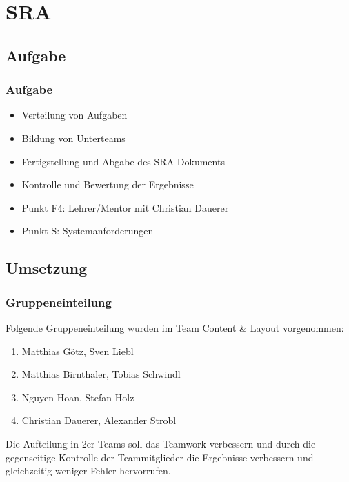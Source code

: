 \section{SRA}
\subsection{Aufgabe}
\begin{frame} %
  \frametitle{Aufgabe} %

  	\begin{itemize}
   		\item Verteilung von Aufgaben
   		\item Bildung von Unterteams
   		\item Fertigstellung und Abgabe des SRA-Dokuments
   		\item Kontrolle und Bewertung der Ergebnisse
  	\end{itemize}
	\bigskip {}
	\begin{itemize}
		\item Punkt F4: Lehrer/Mentor mit Christian Dauerer
		\item Punkt S: Systemanforderungen
	\end{itemize}
\end{frame}

\subsection{Umsetzung}
\begin{frame} %
  \frametitle{Gruppeneinteilung} %
  
  Folgende Gruppeneinteilung wurden im Team Content \& Layout vorgenommen:
  \begin{block}{}
  	\begin{enumerate}
  		\item Matthias Götz, Sven Liebl
  		\item Matthias Birnthaler, Tobias Schwindl
  		\item Nguyen Hoan, Stefan Holz
  		\item Christian Dauerer, Alexander Strobl
  	\end{enumerate}
  \end{block}
  Die Aufteilung in 2er Teams soll das Teamwork verbessern und durch die gegenseitige Kontrolle der Teammitglieder die Ergebnisse verbessern und gleichzeitig weniger Fehler hervorrufen.
\end{frame}

